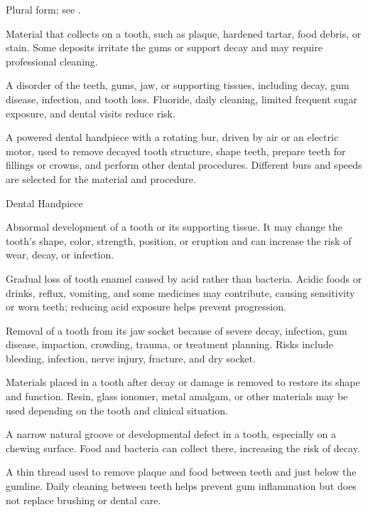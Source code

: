  Plural form; see .

 Material that collects on a tooth, such as plaque, hardened tartar, food debris, or stain. Some deposits irritate the gums or support decay and may require professional cleaning.

 A disorder of the teeth, gums, jaw, or supporting tissues, including decay, gum disease, infection, and tooth loss. Fluoride, daily cleaning, limited frequent sugar exposure, and dental visits reduce risk.

 A powered dental handpiece with a rotating bur, driven by air or an electric motor, used to remove decayed tooth structure, shape teeth, prepare teeth for fillings or crowns, and perform other dental procedures. Different burs and speeds are selected for the material and procedure.

\synonyms
Dental Handpiece

 Abnormal development of a tooth or its supporting tissue. It may change the tooth’s shape, color, strength, position, or eruption and can increase the risk of wear, decay, or infection.

 Gradual loss of tooth enamel caused by acid rather than bacteria. Acidic foods or drinks, reflux, vomiting, and some medicines may contribute, causing sensitivity or worn teeth; reducing acid exposure helps prevent progression.

 Removal of a tooth from its jaw socket because of severe decay, infection, gum disease, impaction, crowding, trauma, or treatment planning. Risks include bleeding, infection, nerve injury, fracture, and dry socket.

 Materials placed in a tooth after decay or damage is removed to restore its shape and function. Resin, glass ionomer, metal amalgam, or other materials may be used depending on the tooth and clinical situation.

 A narrow natural groove or developmental defect in a tooth, especially on a chewing surface. Food and bacteria can collect there, increasing the risk of decay.

 A thin thread used to remove plaque and food between teeth and just below the gumline. Daily cleaning between teeth helps prevent gum inflammation but does not replace brushing or dental care.

